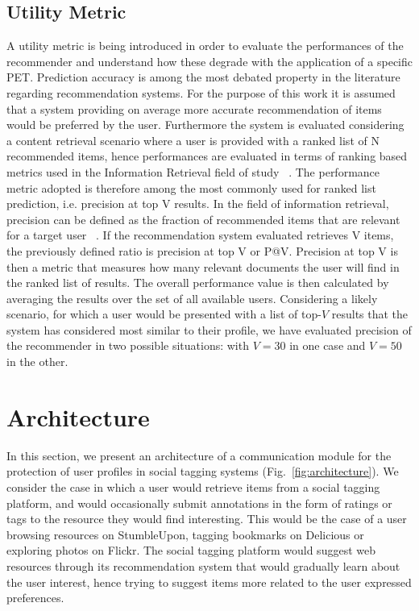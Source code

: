 \subsection{Utility Metric}
A utility metric is being introduced in order to evaluate the performances of the recommender and understand how these degrade with the application of a specific PET.
Prediction accuracy is among the most debated property in the literature regarding recommendation systems. For the purpose of this work it is assumed that a system providing on average more accurate recommendation of items would be preferred by the user. Furthermore the system is evaluated considering a content retrieval scenario where a user is provided with a ranked list of N recommended items, hence performances are evaluated in terms of ranking based metrics used in the Information Retrieval field of study~\cite{a16} .
The performance metric adopted is therefore among the most commonly used for ranked list prediction, i.e. precision at top V results. In the field of information retrieval, precision can be defined as the fraction of recommended items that are relevant for a target user~\cite{a17} . If the recommendation system evaluated retrieves V items, the previously defined ratio is precision at top V or P@V. Precision at top V is then a metric that measures how many relevant documents the user will find in the ranked list of results.
The overall performance value is then calculated by averaging the results over the set of all available users.
Considering a likely scenario, for which a user would be presented with a list of top-$V$ results that the system has considered most similar to their profile, we have evaluated precision of the recommender in two possible situations: with $V=30$ in one case and $V=50$ in the other.

\section{Architecture}
\label{sec:architecture}
In this section, we present an architecture of a communication module for the protection of user profiles in social tagging systems (Fig.~\ref{fig:architecture}). We consider the case in which a user would retrieve items from a social tagging platform, and would occasionally submit annotations in the form of ratings or tags to the resource they would find interesting. This would be the case of a user browsing resources on StumbleUpon, tagging bookmarks on Delicious or exploring photos on Flickr. The social tagging platform would suggest web resources through its recommendation system that would gradually learn about the user interest, hence trying to suggest items more related to the user expressed preferences.

